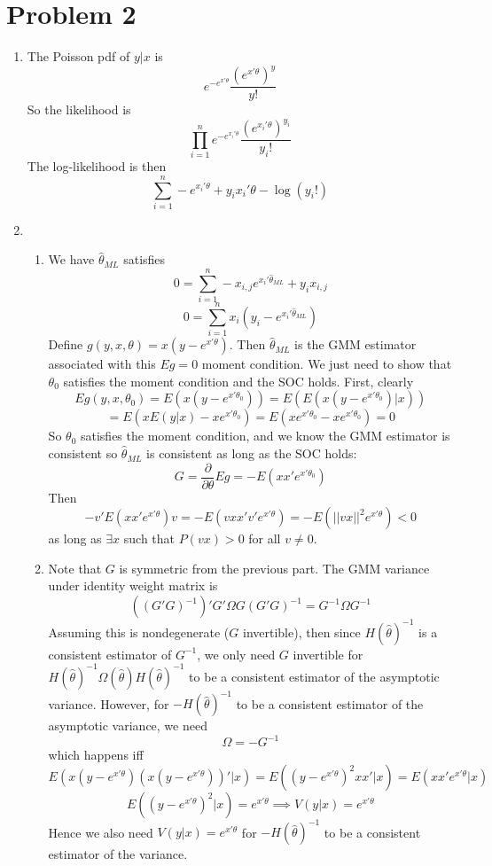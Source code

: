 \documentclass[10pt,letter]{article}
\begin{document}
\section*{Problem 2}
\begin{enumerate}[label=(\alph*)]
\item The Poisson pdf of $y|x$ is
\[ e^{-e^{x'\theta}}\frac{(e^{x'\theta})^y}{y!} \]
So the likelihood is
\[ \prod_{i=1}^n e^{-e^{x_i'\theta}}\frac{(e^{x_i'\theta})^{y_i}}{y_i!} \]
The log-likelihood is then
\[ \sum_{i=1}^n -e^{x_i'\theta} + y_i x_i'\theta - \log(y_i!) \]
\item \begin{enumerate}[label=(\roman*)]
\item We have $\hat{\theta}_{ML} $ satisfies
\[ 0 = \sum_{i=1}^n -x_{i,j} e^{x_i'\hat{\theta}_{ML}} + y_i x_{i,j} \]
\[ 0 = \sum_{i=1}^n x_i (y_i - e^{x_i'\hat{\theta}_{ML}}  ) \]
Define $g(y,x,\theta) = x(y - e^{x'\theta})$. Then $\hat{\theta}_{ML}$ is the GMM estimator associated with this $Eg = 0$ moment condition. We just need to show that $\theta_0$ satisfies the moment condition and the SOC holds. First, clearly
\[ Eg(y,x,\theta_0) = E(x(y - e^{x'\theta_0})) = E(E(x(y - e^{x'\theta_0})|x))\]\[ = E(xE(y|x) - xe^{x'\theta_0}) = E(xe^{x'\theta_0} - xe^{x'\theta_0}) = 0 \]
So $\theta_0$ satisfies the moment condition, and we know the GMM estimator is consistent so $\hat{\theta}_{ML}$ is consistent as long as the SOC holds:
\[ G = \frac{\partial}{\partial \theta} Eg = -E(xx'e^{x'\theta_0}) \]
Then
\[ -v'E(xx'e^{x'\theta})v = - E(vxx'v'e^{x'\theta}) = -E(||vx||^2e^{x'\theta}) < 0 \]
as long as $\exists x$ such that $P(vx) > 0 $ for all $v \neq 0$.
\item Note that $G$ is symmetric from the previous part. The GMM variance under identity weight matrix is
\[ ((G'G)^{-1})'G' \Omega G (G'G)^{-1} = G^{-1}\Omega G^{-1} \]
Assuming this is nondegenerate ($G$ invertible), then since $H(\hat{\theta})^{-1}$ is a consistent estimator of $G^{-1}$, we only need $G$ invertible for $H(\hat{\theta})^{-1} \Omega(\hat{\theta})H(\hat{\theta})^{-1}$ to be a consistent estimator of the asymptotic variance. However, for $-H(\hat{\theta})^{-1}$ to be a consistent estimator of the asymptotic variance, we need
\[ \Omega = -G^{-1} \]
which happens iff
\[E(x(y - e^{x'\theta})(x(y - e^{x'\theta}))'| x)= E((y - e^{x'\theta})^2 xx' | x) = E(xx'e^{x'\theta} | x) \]
\[ E((y-e^{x'\theta})^2 | x) = e^{x'\theta} \implies V(y|x) = e^{x'\theta} \]
Hence we also need $V(y|x) = e^{x'\theta}$ for $-H(\hat{\theta})^{-1}$ to be a consistent estimator of the variance.
\end{enumerate}
\end{enumerate}
\end{document}
